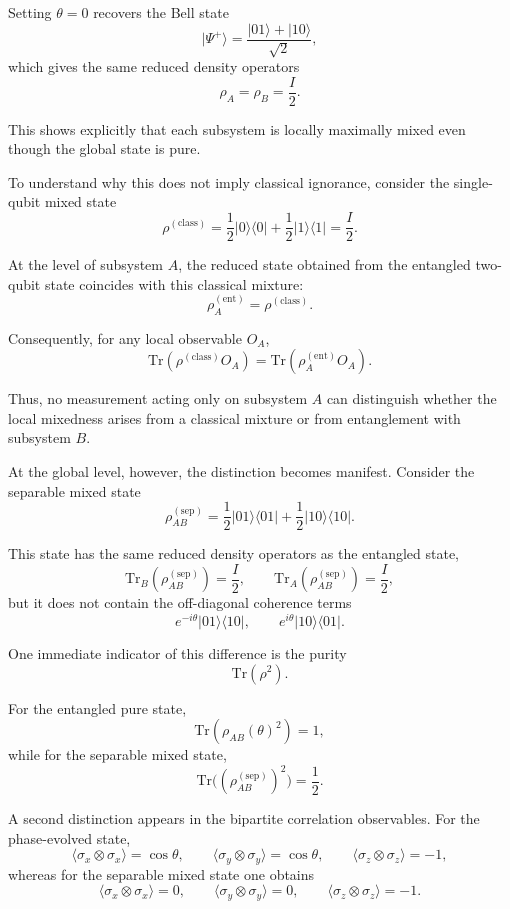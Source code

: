 \documentclass[a4paper]{article}
\begin{document}
\medskip

Setting $\theta = 0$ recovers the Bell state
\[
|\Psi^+\rangle = \frac{|01\rangle + |10\rangle}{\sqrt{2}},
\]
which gives the same reduced density operators
\[
\rho_A = \rho_B = \frac{I}{2}.
\]

This shows explicitly that each subsystem is locally maximally mixed even though the global state is pure.

\medskip

To understand why this does not imply classical ignorance, consider the single-qubit mixed state
\[
\rho^{(\mathrm{class})}
=
\frac{1}{2}|0\rangle\langle 0|
+
\frac{1}{2}|1\rangle\langle 1|
=
\frac{I}{2}.
\]

At the level of subsystem $A$, the reduced state obtained from the entangled two-qubit state coincides with this classical mixture:
\[
\rho_A^{(\mathrm{ent})} = \rho^{(\mathrm{class})}.
\]

Consequently, for any local observable $O_A$,
\[
\mathrm{Tr}(\rho^{(\mathrm{class})} O_A)
=
\mathrm{Tr}(\rho_A^{(\mathrm{ent})} O_A).
\]

Thus, no measurement acting only on subsystem $A$ can distinguish whether the local mixedness arises from a classical mixture or from entanglement with subsystem $B$.

\medskip

At the global level, however, the distinction becomes manifest. Consider the separable mixed state
\[
\rho_{AB}^{(\mathrm{sep})}
=
\frac{1}{2}|01\rangle\langle 01|
+
\frac{1}{2}|10\rangle\langle 10|.
\]

This state has the same reduced density operators as the entangled state,
\[
\mathrm{Tr}_B(\rho_{AB}^{(\mathrm{sep})}) = \frac{I}{2},
\qquad
\mathrm{Tr}_A(\rho_{AB}^{(\mathrm{sep})}) = \frac{I}{2},
\]
but it does not contain the off-diagonal coherence terms
\[
e^{-i\theta}|01\rangle\langle 10|,
\qquad
e^{i\theta}|10\rangle\langle 01|.
\]

One immediate indicator of this difference is the purity
\[
\mathrm{Tr}(\rho^2).
\]

For the entangled pure state,
\[
\mathrm{Tr}(\rho_{AB}(\theta)^2) = 1,
\]
while for the separable mixed state,
\[
\mathrm{Tr}\big((\rho_{AB}^{(\mathrm{sep})})^2\big) = \frac{1}{2}.
\]

A second distinction appears in the bipartite correlation observables. For the phase-evolved state,
\[
\langle \sigma_x \otimes \sigma_x \rangle = \cos\theta, \qquad
\langle \sigma_y \otimes \sigma_y \rangle = \cos\theta, \qquad
\langle \sigma_z \otimes \sigma_z \rangle = -1,
\]
whereas for the separable mixed state one obtains
\[
\langle \sigma_x \otimes \sigma_x \rangle = 0, \qquad
\langle \sigma_y \otimes \sigma_y \rangle = 0, \qquad
\langle \sigma_z \otimes \sigma_z \rangle = -1.
\]
\end{document}
